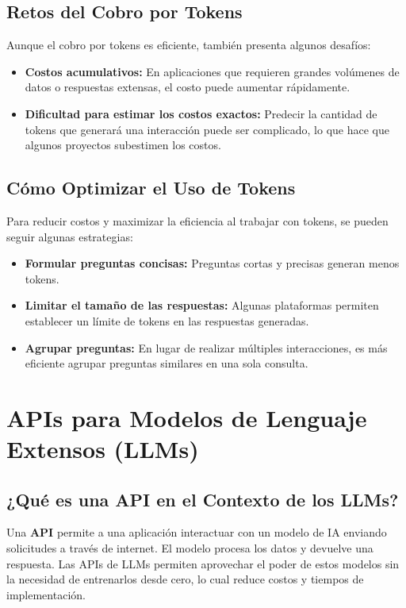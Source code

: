 \subsection{Retos del Cobro por Tokens}\label{retos-del-cobro-por-tokens}
Aunque el cobro por tokens es eficiente, también presenta algunos desafíos:
\begin{itemize}
    \item \textbf{Costos acumulativos:} En aplicaciones que requieren grandes volúmenes de datos o respuestas extensas, el costo puede aumentar rápidamente.
    \item \textbf{Dificultad para estimar los costos exactos:} Predecir la cantidad de tokens que generará una interacción puede ser complicado, lo que hace que algunos proyectos subestimen los costos.
\end{itemize}

\subsection{Cómo Optimizar el Uso de Tokens}\label{como-optimizar-uso-tokens}
Para reducir costos y maximizar la eficiencia al trabajar con tokens, se pueden seguir algunas estrategias:
\begin{itemize}
    \item \textbf{Formular preguntas concisas:} Preguntas cortas y precisas generan menos tokens.
    \item \textbf{Limitar el tamaño de las respuestas:} Algunas plataformas permiten establecer un límite de tokens en las respuestas generadas.
    \item \textbf{Agrupar preguntas:} En lugar de realizar múltiples interacciones, es más eficiente agrupar preguntas similares en una sola consulta.
\end{itemize}

\section{APIs para Modelos de Lenguaje Extensos (LLMs)}\label{apis-para-llms}

\subsection{¿Qué es una API en el Contexto de los LLMs?}\label{que-es-api-llms}
Una \textbf{API} permite a una aplicación interactuar con un modelo de IA enviando solicitudes a través de internet. El modelo procesa los datos y devuelve una respuesta. Las APIs de LLMs permiten aprovechar el poder de estos modelos sin la necesidad de entrenarlos desde cero, lo cual reduce costos y tiempos de implementación.

